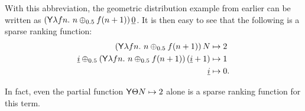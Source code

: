With this abbreviation, the geometric distribution example from earlier can be written as $(\tY \lambda f n.\ n \oplus_{0.5} f(n+1)) \, \underline 0$. It is then easy to see that the following is a sparse ranking function:
\begin{align*}
(\mathsf{Y} \lambda f n.\ n \oplus_{0.5} f(n+1))\, N & \mapsto 2 \\
\underline i \oplus_{0.5} (\mathsf{Y} \lambda f n.\ n \oplus_{0.5} f(n+1))\, (\underline i + 1) & \mapsto 1 \\
\underline i & \mapsto 0.
\end{align*}

In fact, even the partial function $\mathsf{Y} \Theta N \mapsto 2$ alone is a sparse ranking function for this term.
